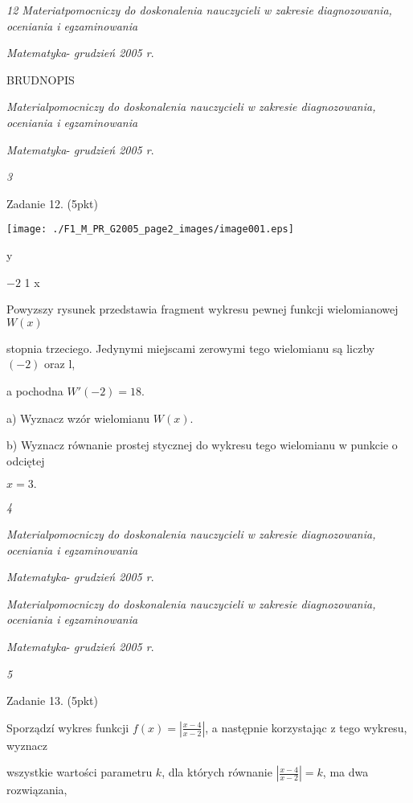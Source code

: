 \documentclass[a4paper,12pt]{article}
\begin{document}
{\it 12 Materiatpomocniczy do doskonalenia nauczycieli w zakresie diagnozowania, oceniania i egzaminowania}

{\it Matematyka}- {\it grudzień 2005 r}.

BRUDNOPIS





{\it Materialpomocniczy do doskonalenia nauczycieli w zakresie diagnozowania, oceniania i egzaminowania}

{\it Matematyka}- {\it grudzień 2005 r}.

{\it 3}

Zadanie 12. (5pkt)
\begin{center}
\texttt{[image: ./F1\_M\_PR\_G2005\_page2\_images/image001.eps]}
\end{center}
y

$-2$  1  x

Powyzszy rysunek przedstawia fragment wykresu pewnej funkcji wielomianowej $W(x)$

stopnia trzeciego. Jedynymi miejscami zerowymi tego wielomianu są liczby $(-2)$ oraz l,

a pochodna $W'(-2)=18.$

a) Wyznacz wzór wielomianu $W(x).$

b) Wyznacz równanie prostej stycznej do wykresu tego wielomianu w punkcie o odciętej

$x=3.$





{\it 4}

{\it Materialpomocniczy do doskonalenia nauczycieli w zakresie diagnozowania, oceniania i egzaminowania}

{\it Matematyka}- {\it grudzień 2005 r}.





{\it Materialpomocniczy do doskonalenia nauczycieli w zakresie diagnozowania, oceniania i egzaminowania}

{\it Matematyka}- {\it grudzień 2005 r}.

{\it 5}

Zadanie 13. (5pkt)

Sporządzí wykres funkcji $f(x)=|\displaystyle \frac{x-4}{x-2}|$, a następnie korzystając z tego wykresu, wyznacz

wszystkie wartości parametru $k$, dla których równanie $|\displaystyle \frac{x-4}{x-2}|=k$, ma dwa rozwiązania,
\end{document}
